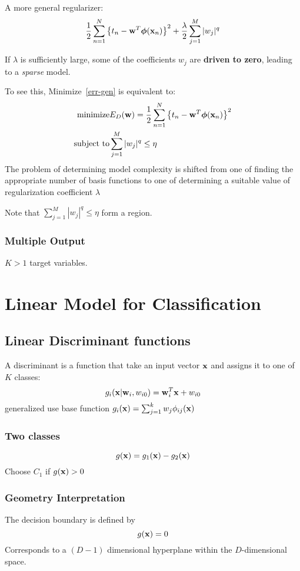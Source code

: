 \vspace{1cm}

A more general regularizer:
\begin{equation}
    \frac{1}{2} \sum_{n=1}^N {\left\{ t_n - \mathbf{w}^T\boldsymbol\phi(\mathbf{x}_n) \right\}}^2
    + \frac{\lambda}{2}\sum_{j=1}^M|w_j|^q
    \label{err-gen}
\end{equation}

If $\lambda$ is sufficiently large, some of the coefficients $w_j$ are
\textbf{driven to zero}, leading to a \emph{sparse} model.

To see this, Minimize~\ref{err-gen} is equivalent to:
\begin{align}
    \mbox{minimize} & E_D(\mathbf{w}) = \frac{1}{2}\sum_{n=1}^N{\left\{ t_n -
        \mathbf{w}^T\boldsymbol\phi(\mathbf{x}_n)
    \right\}}^2 \\
    \mbox{subject to} & \sum_{j=1}^M |w_j|^q \leq \eta
\end{align}
The problem of determining model complexity is shifted from one of finding
the appropriate number of basis functions to one of determining a suitable
value of regularization coefficient $\lambda$

Note that $\sum_{j=1}^M |w_j|^q \leq \eta$ form a region.

\subsection{Multiple Output}
$K > 1$ target variables.


\chapter{Linear Model for Classification}
\section{Linear Discriminant functions}
A discriminant is a function that take an input vector $\mathbf{x}$ and assigns
it to one of $K$ classes:
\[g_i(\mathbf{x}|\mathbf{w}_i, w_{i0}) =\mathbf{w}_i^T\mathbf{x} + w_{i0}\] generalized use base
function $g_i(\mathbf{x}) = \sum_{j=1}^k w_j \phi_{ij}(\mathbf{x})$
\subsection{Two classes}
\[g(\mathbf{x}) = g_1(\mathbf{x}) - g_2(\mathbf{x}) \] 
Choose $C_1$ if $g(\mathbf{x})>0$

\subsection{Geometry Interpretation}
The decision boundary is defined by 
\[ g(\mathbf{x}) = 0\]
Corresponds to a $(D-1)$ dimensional hyperplane within the $D$-dimensional
space.


